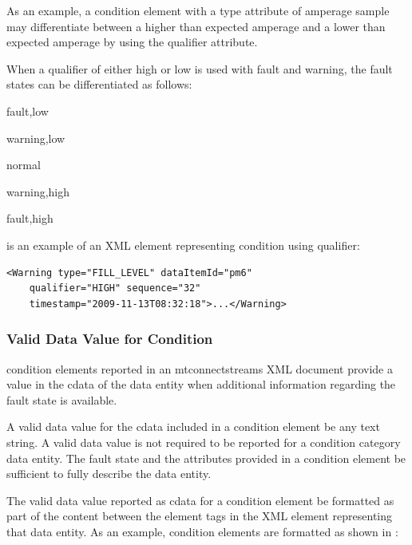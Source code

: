 As an example, a \gls{condition} element with a \gls{type} attribute of \gls{amperage sample} may differentiate between a higher than expected amperage and a lower than expected amperage by using the \gls{qualifier} attribute.

When a \gls{qualifier} of either \gls{high} or \gls{low} is used with \gls{fault} and \gls{warning}, the \glspl{fault state} can be differentiated as follows:

\quad \gls{fault},\gls{low}

\quad \gls{warning},\gls{low}

\quad \gls{normal}

\quad \gls{warning},\gls{high}

\quad \gls{fault},\gls{high}
     
 is an example of an XML element representing \gls{condition} using \gls{qualifier}:

\begin{lstlisting}[firstnumber=1,escapechar=|,%
    caption={Example of a Condition Element using qualifier},label={lst:example-of-condition-using-qualifier}]
<Warning type="FILL_LEVEL" dataItemId="pm6" 
    qualifier="HIGH" sequence="32" 
    timestamp="2009-11-13T08:32:18">...</Warning>
\end{lstlisting}

\subsubsection{Valid Data Value for Condition}

\gls{condition} elements reported in an \gls{mtconnectstreams} XML document \may provide a value in the \gls{cdata} of the \gls{data entity} when additional information regarding the \gls{fault state} is available.

A \gls{valid data value} for the \gls{cdata} included in a \gls{condition} element \may be any text string.   A \gls{valid data value} is not required to be reported for a \gls{condition} category \gls{data entity}.  The \gls{fault state} and the attributes provided in a \gls{condition} element \may be sufficient to fully describe the \gls{data entity}.

The \gls{valid data value} reported as \gls{cdata} for a \gls{condition} element \must be formatted as part of the content between the element tags in the XML element representing that \gls{data entity}.  As an example, \gls{condition} elements are formatted as shown in :

